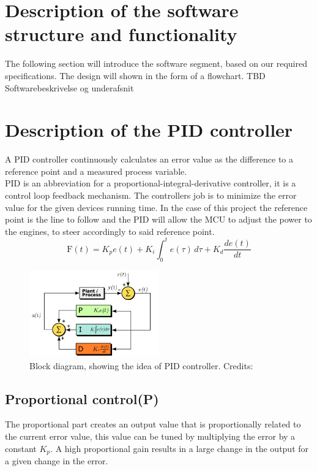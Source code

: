 \section{Description of the software structure and functionality}

The following section will introduce the software segment, based on our required specifications. The design will shown in the form of a flowchart.
TBD Softwarebeskrivelse og underafsnit

\section {Description of the PID controller} 
 
A PID controller continuously calculates an error value as the difference to a reference point and a measured process variable.\\
PID is an abbreviation for a proportional-integral-derivative controller, it is a control loop feedback mechanism. The controllers job is to minimize the error value for the given devices running time. In the case of this project the reference point is the line to follow and the PID will allow the MCU to adjust the power to the engines, to steer accordingly to said reference point.
$$\mathrm{F}(t)=K_p{e(t)} + K_{i}\int_{0}^{t}{e(\tau)}\,{d\tau} + K_{d}\frac{de(t)}{dt}$$

\begin{figure}[h!]
  \centering
  \includegraphics[width=0.5\textwidth]{figures/PID_block.png}
  
  \caption{Block diagram, showing the idea of PID controller. Credits: %
  }
  \label{PID controller}
\end{figure}

\subsection {Proportional control(P)}

The proportional part creates an output value that is proportionally related to the current error value, this value can be tuned by multiplying the error by a constant $K_p$. A high proportional gain results in a large change in the output for a given change in the error. 


